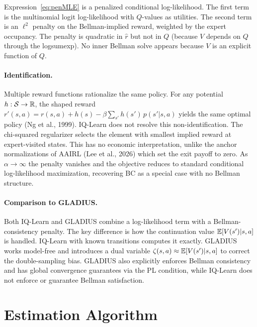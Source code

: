 \documentclass[10pt]{article}
\begin{document}
Expression~\eqref{eq:penMLE} is a penalized conditional log-likelihood. The first term is the multinomial logit log-likelihood with $Q$-values as utilities. The second term is an $\ell^2$ penalty on the Bellman-implied reward, weighted by the expert occupancy. The penalty is quadratic in $\hat{r}$ but not in $Q$ (because $V$ depends on $Q$ through the logsumexp). No inner Bellman solve appears because $V$ is an explicit function of $Q$.

\paragraph{Identification.} Multiple reward functions rationalize the same policy. For any potential $h: \mathcal{S} \to \mathbb{R}$, the shaped reward $r'(s,a) = r(s,a) + h(s) - \beta\sum_{s'} h(s')\,p(s'|s,a)$ yields the same optimal policy (Ng et al., 1999). IQ-Learn does not resolve this non-identification. The chi-squared regularizer selects the element with smallest implied reward at expert-visited states. This has no economic interpretation, unlike the anchor normalizations of AAIRL (Lee et al., 2026) which set the exit payoff to zero. As $\alpha \to \infty$ the penalty vanishes and the objective reduces to standard conditional log-likelihood maximization, recovering BC as a special case with no Bellman structure.

\paragraph{Comparison to GLADIUS.} Both IQ-Learn and GLADIUS combine a log-likelihood term with a Bellman-consistency penalty. The key difference is how the continuation value $\mathbb{E}[V(s')|s,a]$ is handled. IQ-Learn with known transitions computes it exactly. GLADIUS works model-free and introduces a dual variable $\zeta(s,a) \approx \mathbb{E}[V(s')|s,a]$ to correct the double-sampling bias. GLADIUS also explicitly enforces Bellman consistency and has global convergence guarantees via the PL condition, while IQ-Learn does not enforce or guarantee Bellman satisfaction.


\section{Estimation Algorithm}
\end{document}
